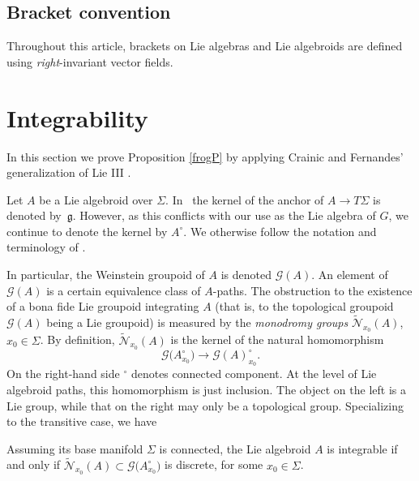 \subsection*{Bracket convention}
Throughout this article, brackets on
Lie algebras and Lie algebroids are defined using {\em
right}-invariant vector fields.

\section{Integrability}
\label{newsec}

In this section we prove Proposition \ref{frogP} by applying Crainic
and Fernandes' generalization of Lie III \cite{Crainic_Fernandes_03}.

Let $A$ be a Lie algebroid over $\Sigma$. In~\cite{Crainic_Fernandes_03, Crainic_Fernandes_11} the kernel of the
anchor of $A \rightarrow T \Sigma$ is denoted by~${\mathfrak g}
$. However, as this conflicts with our use as the Lie algebra of $G$,
we continue to denote the kernel by $A^\circ$. We otherwise follow the
notation and terminology of \cite{Crainic_Fernandes_11}.

In particular, the Weinstein groupoid of $A$ is denoted ${\mathcal
G}(A)$. An element of ${\mathcal G}(A)$ is a certain equivalence class
of $A$-paths. The obstruction to the existence of a bona fide Lie
groupoid integrating $A$ (that is, to the topological groupoid
${\mathcal G}(A)$ being a Lie groupoid) is measured by the {\it monodromy groups} $\tilde {\mathcal N}_{x_0}(A) $, $x_0 \in \Sigma
$. By definition, $\tilde {\mathcal N}_{x_0}(A) $ is the kernel of the
natural homomorphism
\begin{equation}
{\mathcal G}\big(A^\circ_{x_0}\big)\rightarrow {\mathcal G}(A)^\circ_{x_0} \label{dqp}.
\end{equation} On the right-hand side ${}^\circ$ denotes connected
component. At the level of Lie algebroid paths, this homomorphism is
just inclusion. The object on the left is a Lie group, while that on
the right may only be a topological group. Specializing
\cite{Crainic_Fernandes_03} to the transitive case, we have

\begin{Theorem}%
 Assuming its base manifold $\Sigma $ is connected, the Lie algebroid
 $A$ is integrable if and only if
 $\tilde {\mathcal N}_{x_0}(A) \subset {\mathcal G}\big(A^\circ_{x_0}\big)$
 is discrete, for some $x_0 \in \Sigma $.
\end{Theorem}

